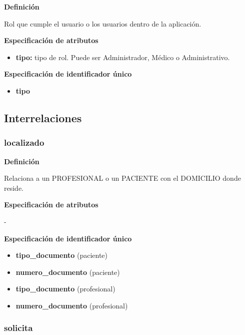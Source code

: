 \documentclass[a4paper,11pt]{article}
\begin{document}
\textbf{Definición}

Rol que cumple el usuario o los usuarios dentro de la aplicación.

\textbf{Especificación de atributos}

\begin{itemize}

     \item \textbf{tipo:} tipo de rol. Puede ser Administrador, Médico o Administrativo. 

\end{itemize}

\textbf{Especificación de identificador único}

\begin{itemize}

     \item \textbf{tipo}

\end{itemize}

\subsection{\textbf{Interrelaciones}}

\subsubsection{\textbf{localizado}}

\textbf{Definición}

Relaciona a un PROFESIONAL o un PACIENTE con el DOMICILIO donde reside.

\textbf{Especificación de atributos}

-

\textbf{Especificación de identificador único}

\begin{itemize}

     \item \textbf{tipo\_documento} (paciente)

     \item \textbf{numero\_documento} (paciente)

     \item \textbf{tipo\_documento} (profesional)

     \item \textbf{numero\_documento} (profesional)

\end{itemize}

\subsubsection{\textbf{solicita}}
\end{document}
